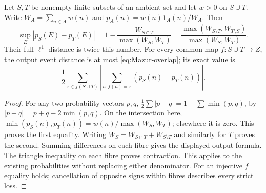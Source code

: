 \begin{proposition}
\label{prop:Mazur-source-overlap}
Let \(S,T\) be nonempty finite subsets of an ambient set and let \(w>0\)
on \(S\cup T\). Write \(W_A=\sum_{n\in A}w(n)\) and
\(p_A(n)=w(n)\mathbf1_A(n)/W_A\).
Then
\begin{equation}
 \sup_E|p_S(E)-p_T(E)|
 =1-\frac{W_{S\cap T}}{\max(W_S,W_T)}
 =\frac{\max(W_{S\setminus T},W_{T\setminus S})}
             {\max(W_S,W_T)}.
 \label{eq:Mazur-overlap}
\end{equation}
Their full \(\ell^1\) distance is twice this number.
For every common map \(f:S\cup T\to Z\), the output event distance
is at most \eqref{eq:Mazur-overlap}; its exact value is
\[
 \frac12\sum_{z\in f(S\cup T)}
 \left|\sum_{n:f(n)=z}(p_S(n)-p_T(n))\right|.
\]
\end{proposition}
\begin{proof}
For any two probability vectors \(p,q\),
\(\frac12\sum|p-q|=1-\sum\min(p,q)\), by
\(|p-q|=p+q-2\min(p,q)\). On the intersection here,
\(\min(p_S(n),p_T(n))=w(n)/\max(W_S,W_T)\);
elsewhere it is zero. This proves the first equality. Writing
\(W_S=W_{S\cap T}+W_{S\setminus T}\) and similarly for \(T\)
proves the second. Summing differences on each fibre gives the
displayed output formula. The triangle inequality on each fibre
proves contraction. This applies to the existing probabilities
without replacing either denominator. For an injective \(f\) equality
holds; cancellation of opposite signs within fibres describes every
strict loss.
\end{proof}

